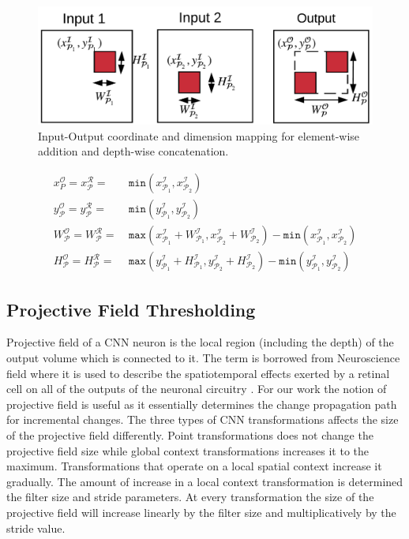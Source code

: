 \begin{figure}[t]
\includegraphics[width=\columnwidth]{images/la_operators}
\caption{Input-Output coordinate and dimension mapping for element-wise addition and depth-wise concatenation.}
\label{fig:la_operators}
\end{figure}

\begin{align}
\label{eqn:laxcoordinate}
x^\mathcal{O}_P = x^\mathcal{R}_\mathcal{P} =&~ \texttt{min}(x^\mathcal{I}_{\mathcal{P}_1},x^\mathcal{I}_{\mathcal{P}_2})\\
\label{eqn:laycoordinate}
y^\mathcal{O}_\mathcal{P} = y^\mathcal{R}_\mathcal{P} =&~ \texttt{min}(y^\mathcal{I}_{\mathcal{P}_1},y^\mathcal{I}_{\mathcal{P}_2})\\
\label{eqn:lapatchwidth}
W^\mathcal{O}_\mathcal{P} = W^\mathcal{R}_\mathcal{P} =&~ \texttt{max}(x^\mathcal{I}_{\mathcal{P}_1}+W^\mathcal{I}_{\mathcal{P}_1},x^\mathcal{I}_{\mathcal{P}_2}+W^\mathcal{I}_{\mathcal{P}_2})-\texttt{min}(x^\mathcal{I}_{\mathcal{P}_1},x^\mathcal{I}_{\mathcal{P}_2})\\
\label{eqn:lapatchheight}
H^\mathcal{O}_\mathcal{P} = H^\mathcal{R}_\mathcal{P} =&~ \texttt{max}(y^\mathcal{I}_{\mathcal{P}_1}+H^\mathcal{I}_{\mathcal{P}_1},y^\mathcal{I}_{\mathcal{P}_2}+H^\mathcal{I}_{\mathcal{P}_2})-\texttt{min}(y^\mathcal{I}_{\mathcal{P}_1},y^\mathcal{I}_{\mathcal{P}_2})
\end{align}


\subsection{Projective Field Thresholding}

Projective field \cite{le2017receptive, basiccnnoperations} of a CNN neuron is the local region (including the depth) of the output volume which is connected to it.
The term is borrowed from Neuroscience field where it is used to describe the spatiotemporal effects exerted by a retinal cell on all of the outputs of the neuronal circuitry \cite{de2011projective}.
For our work the notion of projective field is useful as it essentially determines the change propagation path for incremental changes.
The three types of CNN transformations affects the size of the projective field differently. Point transformations does not change the projective field size while global context transformations increases it to the maximum. Transformations that operate on a local spatial context increase it gradually.
The amount of increase in a local context transformation is determined the filter size and stride parameters. At every transformation the size of the projective field will increase linearly by the filter size and multiplicatively by the stride value.

